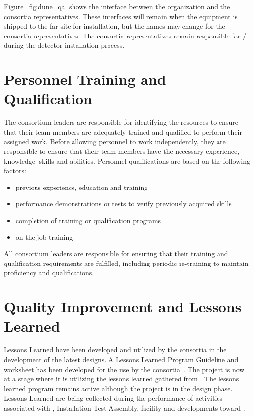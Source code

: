 Figure~\ref{fig:dune_qa} shows the interface between the
  organization and the consortia 
representatives.  These interfaces will remain when the equipment is
shipped to the far site for installation, but the names may change for
the consortia  representatives.  The consortia 
representatives remain responsible for / during the
detector installation process.


\section{Personnel Training and Qualification}

The  consortium leaders are responsible for identifying the
resources to ensure that their team members are adequately trained and
qualified to perform their assigned work. Before allowing personnel to
work independently, they are responsible to ensure that their team
members have the necessary experience, knowledge, skills and
abilities. Personnel qualifications are based on the following
factors:
\begin{itemize}
 \item previous experience, education and training
 \item performance demonstrations or tests to verify previously
   acquired skills
 \item completion of training or qualification programs
 \item on-the-job training
\end{itemize}

All  consortium leaders are responsible for ensuring that
their training and qualification requirements are fulfilled, including
periodic re-training to maintain proficiency and qualifications.


\section{Quality Improvement and Lessons Learned}
\label{sec:quality_improvement}

Lessons Learned have been developed and utilized by the consortia in
the development of the latest designs.  A Lessons Learned Program
Guideline and worksheet has been developed for the use by the
consortia~.  The project is now at a stage where it is
utilizing the lessons learned gathered from . The
lessons learned program remains active although the project is in the
design phase. Lessons Learned are being collected during the
performance of activities associated with ,
  Installation Test Assembly, 
\coldbox facility and developments toward .

